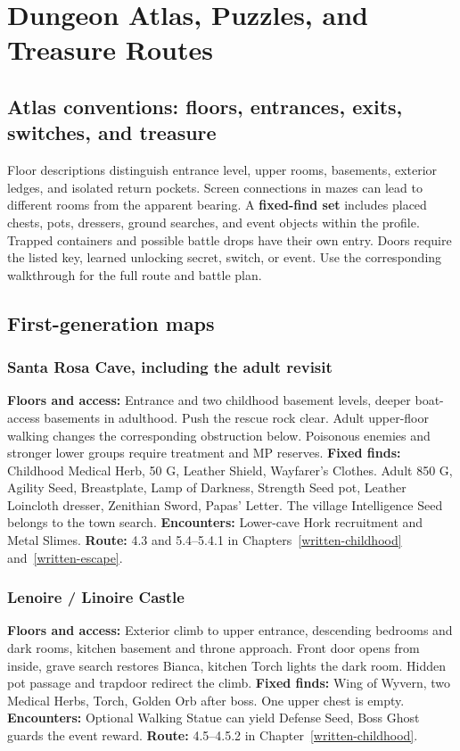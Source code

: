 \chapter{Dungeon Atlas, Puzzles, and Treasure Routes}
\label{written-dungeon-atlas}

\section{Atlas conventions: floors, entrances, exits, switches, and treasure}
Floor descriptions distinguish entrance level, upper rooms, basements, exterior ledges, and isolated return pockets. Screen connections in mazes can lead to different rooms from the apparent bearing. A \textbf{fixed-find set} includes placed chests, pots, dressers, ground searches, and event objects within the profile. Trapped containers and possible battle drops have their own entry. Doors require the listed key, learned unlocking secret, switch, or event. Use the corresponding walkthrough for the full route and battle plan.

\section{First-generation maps}
\subsection{Santa Rosa Cave, including the adult revisit}
\label{atlas-santa-rosa}
\textbf{Floors and access:} Entrance and two childhood basement levels, deeper boat-access basements in adulthood. Push the rescue rock clear. Adult upper-floor walking changes the corresponding obstruction below. Poisonous enemies and stronger lower groups require treatment and MP reserves. \textbf{Fixed finds:} Childhood Medical Herb, 50 G, Leather Shield, Wayfarer's Clothes. Adult 850 G, Agility Seed, Breastplate, Lamp of Darkness, Strength Seed pot, Leather Loincloth dresser, Zenithian Sword, Papas' Letter. The village Intelligence Seed belongs to the town search. \textbf{Encounters:} Lower-cave Hork recruitment and Metal Slimes. \textbf{Route:} 4.3 and 5.4--5.4.1 in Chapters~\ref{written-childhood} and~\ref{written-escape}.

\subsection{Lenoire / Linoire Castle}
\label{atlas-linoire}
\textbf{Floors and access:} Exterior climb to upper entrance, descending bedrooms and dark rooms, kitchen basement and throne approach. Front door opens from inside, grave search restores Bianca, kitchen Torch lights the dark room. Hidden pot passage and trapdoor redirect the climb. \textbf{Fixed finds:} Wing of Wyvern, two Medical Herbs, Torch, Golden Orb after boss. One upper chest is empty. \textbf{Encounters:} Optional Walking Statue can yield Defense Seed, Boss Ghost guards the event reward. \textbf{Route:} 4.5--4.5.2 in Chapter~\ref{written-childhood}.

